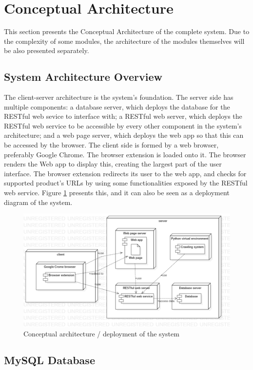 \documentclass[12pt,a4paper,twoside]{report}
\begin{document}
\section{Conceptual Architecture}

This section presents the Conceptual Architecture of the complete system. Due to the complexity of some modules, the architecture of the modules themselves will be also presented separately.


\subsection{System Architecture Overview}

The client-server architecture is the system's foundation. The server side has multiple components: a database server, which deploys the database for the RESTful web sevice to interface with; a RESTful web server, which deploys the RESTful web service to be accessible by every other component in the system's architecture; and a web page server, which deploys the web app so that this can be accessed by the browser. The client side is formed by a web browser, preferably Google Chrome. The browser extension is loaded onto it. The browser renders the Web app to display this, creating the largest part of the user interface. The browser extension redirects its user to the web app, and checks for supported product's URLs by using some functionalities exposed by the RESTful web service. Figure \ref{fig:app_conceptual_architecture_system} presents this, and it can also be seen as a deployment diagram of the system.

\begin{figure}[ht]
  \centering
  \includegraphics[width=0.65\linewidth]{img/app_conceptual_architecture_system.png}
  \caption[]{Conceptual architecture / deployment of the system}
  \label{fig:app_conceptual_architecture_system}
\end{figure}


\subsection{MySQL Database}
\end{document}
